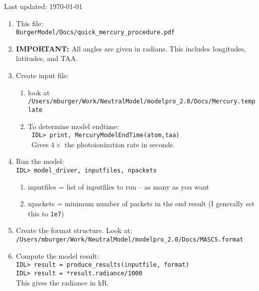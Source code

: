 \documentclass[11pt]{article}
\begin{document}
Last updated: \today

\begin{enumerate}

\item This file:  \\
\texttt{BurgerModel/Docs/quick\_mercury\_procedure.pdf}

\item \textbf{IMPORTANT:} All angles are given in radians. This includes
longitudes, latitudes, and TAA.

\item Create input file: 
  \begin{enumerate}
  \item look at \\
  \texttt{/Users/mburger/Work/NeutralModel/modelpro\_2.0/Docs/Mercury.template}
  \item To determine model endtime: \\
  \verb: IDL> print, MercuryModelEndTime(atom,taa): \\
  \textbullet\ Gives $4\times$ the photoionization rate in seconds. 
  \end{enumerate}

\item Run the model: \\
  \verb:IDL> model_driver, inputfiles, npackets:
  \begin{enumerate}
  \item inputfiles = list of inputfiles to run -- as many as you want
  \item npackets = minimum number of packets in the end result (I generally set
  this to \texttt{1e7})
  \end{enumerate}

\item Create the format structure. Look at: \\
  \texttt{/Users/mburger/Work/NeutralModel/modelpro\_2.0/Docs/MASCS.format}

\item Compute the model result: \\
  \verb:IDL> result = produce_results(inputfile, format): \\
  \verb:IDL> result = *result.radiance/1000:\\
  This gives the radiance in kR.


\end{enumerate}
\end{document}
